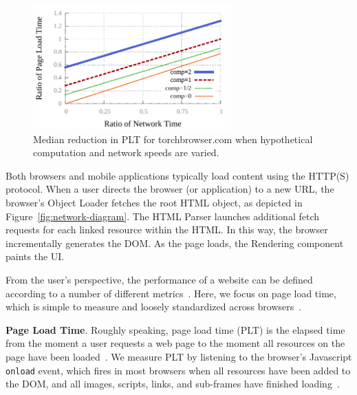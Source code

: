 \begin{figure}[t]
    \includegraphics[width=3in]{../graphs/whatif/ilivid2.pdf}
    \caption[]{\label{fig:whatif}Median reduction in PLT
    for torchbrowser.com when hypothetical computation and network speeds are varied.}
\end{figure}
Both browsers and mobile applications typically load content using the HTTP(S) protocol. When a user directs the browser (or application) to a new URL, the browser's Object Loader fetches the root HTML object, as depicted
in Figure~\ref{fig:network-diagram}. The HTML Parser launches additional
fetch requests for each linked resource within the HTML. In this way, the browser incrementally generates the DOM.
As the page loads, the Rendering component paints the UI.

From the user's perspective, the performance of a website can be defined according to a number of different metrics~\cite{above-the-fold,speed-index}. Here,
we focus on page load time, which is simple to measure
and loosely standardized across browsers~\cite{w3c-onload}.

\textbf{Page Load Time}. Roughly speaking, page load time (PLT) is the elapsed time from the moment a user requests a web page to the moment all resources on the page have been loaded~\cite{page-speed}.
We measure PLT by listening to the browser's Javascript \texttt{onload} event,
which fires in most browsers when all resources have been added to the DOM, and all images,
scripts, links, and sub-frames have finished loading~\cite{w3c-onload}.


